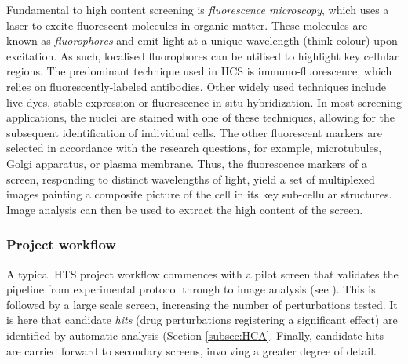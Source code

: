 Fundamental to high content screening is \emph{fluorescence microscopy}, which uses a laser to excite fluorescent molecules in organic matter. These molecules are known as \emph{fluorophores} and emit light at a unique wavelength (think colour) upon excitation. As such, localised fluorophores can be utilised to highlight key cellular regions. The predominant technique used in HCS is immuno-fluorescence, which relies on fluorescently-labeled antibodies. Other widely used techniques include live dyes, stable expression or fluorescence in situ hybridization. In most screening applications, the nuclei are stained with one of these techniques, allowing for the subsequent identification of individual cells. The other fluorescent markers are selected in accordance with the research questions, for example, microtubules, Golgi apparatus, or plasma membrane. Thus, the fluorescence markers of a screen, responding to distinct wavelengths of light, yield a set of multiplexed images painting a composite picture of the cell in its key sub-cellular structures. Image analysis can then be used to extract the high content of the screen.

\subsubsection{Project workflow}

A typical HTS project workflow commences with a pilot screen that validates the pipeline from experimental protocol through to image analysis (see \cite{terjung2010high}). This is followed by a large scale screen, increasing the number of perturbations tested. It is here that candidate \emph{hits} (drug perturbations registering a significant effect) are identified by automatic analysis (Section \ref{subsec:HCA}. Finally, candidate hits are carried forward to secondary screens, involving a greater degree of detail.

%
%
%
%
%

